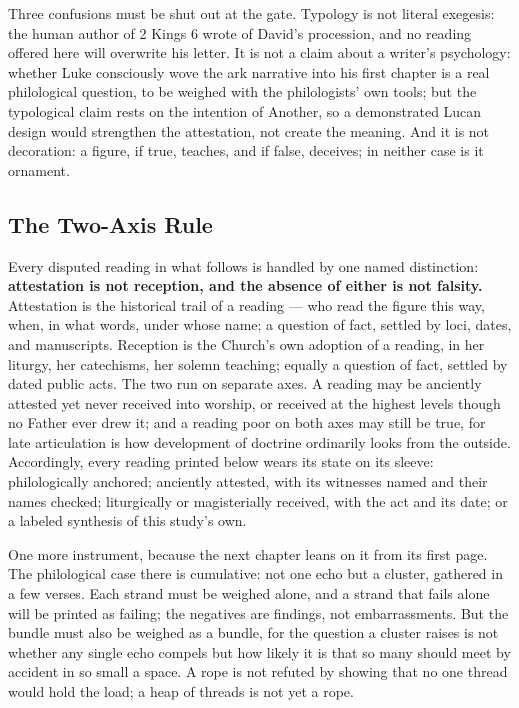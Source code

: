 Three confusions must be shut out at the gate. Typology is not literal
exegesis: the human author of 2 Kings 6 wrote of David's procession, and
no reading offered here will overwrite his letter. It is not a claim about
a writer's psychology: whether Luke consciously wove the ark narrative
into his first chapter is a real philological question, to be weighed with
the philologists' own tools; but the typological claim rests on the
intention of Another, so a demonstrated Lucan design would strengthen the
attestation, not create the meaning. And it is not decoration: a figure,
if true, teaches, and if false, deceives; in neither case is it ornament.

\subsection{The Two-Axis Rule}

Every disputed reading in what follows is handled by one named
distinction: \textbf{attestation is not reception, and the absence of
either is not falsity.} Attestation is the historical trail of a
reading --- who read the figure this way, when, in what words, under whose
name; a question of fact, settled by loci, dates, and manuscripts.
Reception is the Church's own adoption of a reading, in her liturgy, her
catechisms, her solemn teaching; equally a question of fact, settled by
dated public acts. The two run on separate axes. A reading may be
anciently attested yet never received into worship, or received at the
highest levels though no Father ever drew it; and a reading poor on both
axes may still be true, for late articulation is how development of
doctrine ordinarily looks from the outside. Accordingly, every reading
printed below wears its state on its sleeve: philologically anchored;
anciently attested, with its witnesses named and their names checked;
liturgically or magisterially received, with the act and its date; or a
labeled synthesis of this study's own.

One more instrument, because the next chapter leans on it from its first
page. The philological case there is cumulative: not one echo but a
cluster, gathered in a few verses. Each strand must be weighed alone, and
a strand that fails alone will be printed as failing; the negatives are
findings, not embarrassments. But the bundle must also be weighed as a
bundle, for the question a cluster raises is not whether any single echo
compels but how likely it is that so many should meet by accident in so
small a space. A rope is not refuted by showing that no one thread would
hold the load; a heap of threads is not yet a rope.

